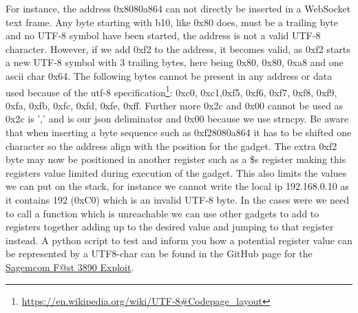 For instance, the address 0x8080a864 can not directly be inserted in a WebSocket text frame. Any byte starting with b10, like 0x80 does, must be a trailing byte and no UTF-8 symbol have been started, the address is not a valid UTF-8 character.
However, if we add 0xf2 to the address, it becomes valid, as 0xf2 starts a new UTF-8 symbol with 3 trailing bytes, here being 0x80, 0x80, 0xa8 and one ascii char 0x64.
The following bytes cannot be present in any address or data used because of the utf-8 specification\footnote{\url{https://en.wikipedia.org/wiki/UTF-8\#Codepage_layout}}: 0xc0, 0xc1,0xf5, 0xf6, 0xf7, 0xf8, 0xf9, 0xfa, 0xfb, 0xfc, 0xfd, 0xfe, 0xff.
Further more 0x2c and 0x00 cannot be used as 0x2c is ',' and is our json deliminator and 0x00 because we use strncpy. 
Be aware that when inserting a byte sequence such as 0xf28080a864 it has to be shifted one character so the address align with the position for the gadget.
The extra 0xf2 byte may now be positioned in another register such as a \$s register making this registers value limited during execution of the gadget.
This also limits the values we can put on the stack, for instance we cannot write the local ip 192.168.0.10 as it contains 192 (0xC0) which is an invalid UTF-8 byte. In the cases were we need to call a function which is unreachable we can use other gadgets to add to registers together adding up to the desired value and jumping to that register instead. A python script to test and inform you how a potential register value can be represented by a UTF8-char can be found in the GitHub page for the \href{https://github.com/Lyrebirds/sagemcom-fast-3890-exploit}{Sagemcom F@st 3890 Exploit}.